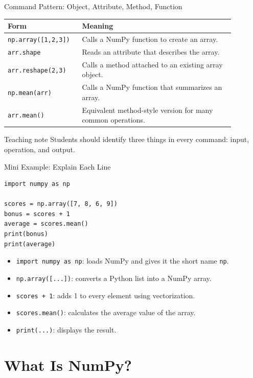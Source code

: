 \documentclass[aspectratio=169,11pt]{beamer}
\begin{document}
\begin{frame}{Command Pattern: Object, Attribute, Method, Function}
\small
\begin{tabular}{p{0.26\linewidth}p{0.62\linewidth}}
\toprule
\textbf{Form} & \textbf{Meaning} \\
\midrule
\texttt{np.array([1,2,3])} & Calls a NumPy function to create an array. \\
\texttt{arr.shape} & Reads an attribute that describes the array. \\
\texttt{arr.reshape(2,3)} & Calls a method attached to an existing array object. \\
\texttt{np.mean(arr)} & Calls a NumPy function that summarizes an array. \\
\texttt{arr.mean()} & Equivalent method-style version for many common operations. \\
\bottomrule
\end{tabular}
\vspace{0.5em}
\begin{alertblock}{Teaching note}
Students should identify three things in every command: input, operation, and output.
\end{alertblock}
\end{frame}

\begin{frame}[fragile]{Mini Example: Explain Each Line}
\small
\begin{lstlisting}[style=py]
import numpy as np

scores = np.array([7, 8, 6, 9])
bonus = scores + 1
average = scores.mean()
print(bonus)
print(average)
\end{lstlisting}
\begin{itemize}
  \item \texttt{import numpy as np}: loads NumPy and gives it the short name \texttt{np}.
  \item \texttt{np.array([...])}: converts a Python list into a NumPy array.
  \item \texttt{scores + 1}: adds 1 to every element using vectorization.
  \item \texttt{scores.mean()}: calculates the average value of the array.
  \item \texttt{print(...)}: displays the result.
\end{itemize}
\end{frame}

\section{What Is NumPy?}
\end{document}
